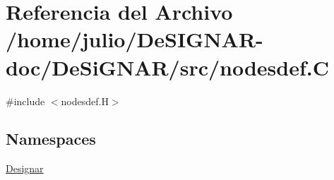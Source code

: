\hypertarget{nodesdef_8_c}{}\section{Referencia del Archivo /home/julio/\+De\+S\+I\+G\+N\+A\+R-\/doc/\+De\+Si\+G\+N\+A\+R/src/nodesdef.C}
\label{nodesdef_8_c}
{\ttfamily \#include $<$nodesdef.\+H$>$}\newline
\subsection*{Namespaces}
\begin{DoxyCompactItemize}
\item 
 \hyperlink{namespace_designar}{Designar}
\end{DoxyCompactItemize}
